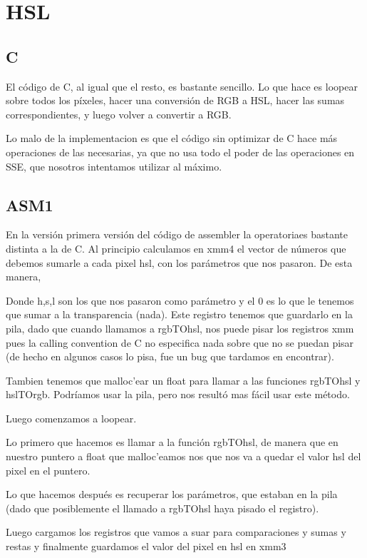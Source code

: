 \section{HSL}

\subsection{C}
El código de C, al igual que el resto, es bastante sencillo. Lo que hace es loopear sobre todos los píxeles, hacer una conversión de RGB a HSL, hacer las sumas correspondientes, y luego volver a convertir a RGB.

Lo malo de la implementacion es que el código sin optimizar de C hace más operaciones de las necesarias, ya que no usa todo el poder de las operaciones en SSE, que nosotros intentamos utilizar al máximo.

\subsection{ASM1}

En la versión primera versión del código de assembler la operatoriaes bastante distinta a la de C.
Al principio calculamos en xmm4 el vector de números que debemos sumarle a cada pixel hsl, con los parámetros que nos pasaron. De esta manera, 


Donde h,s,l son los que nos pasaron como parámetro y el 0 es lo que le tenemos que sumar a la transparencia (nada). Este registro tenemos que guardarlo en la pila, dado que cuando llamamos a rgbTOhsl, nos puede pisar los registros xmm pues la calling convention de C no especifica nada sobre que no se puedan pisar (de hecho en algunos casos lo pisa, fue un bug que tardamos en encontrar).

Tambien tenemos que malloc'ear un float para llamar a las funciones rgbTOhsl y hslTOrgb. Podríamos usar la pila, pero nos resultó mas fácil usar este método.

Luego comenzamos a loopear. 

Lo primero que hacemos es llamar a la función rgbTOhsl, de manera que en nuestro puntero a float que malloc'eamos nos que nos va a quedar el valor hsl del pixel en el puntero.

Lo que hacemos después es recuperar los parámetros, que estaban en la pila (dado que posiblemente el llamado a rgbTOhsl haya pisado el registro).

Luego cargamos los registros que vamos a suar para comparaciones y sumas y restas y finalmente guardamos el valor del pixel en hsl en xmm3

